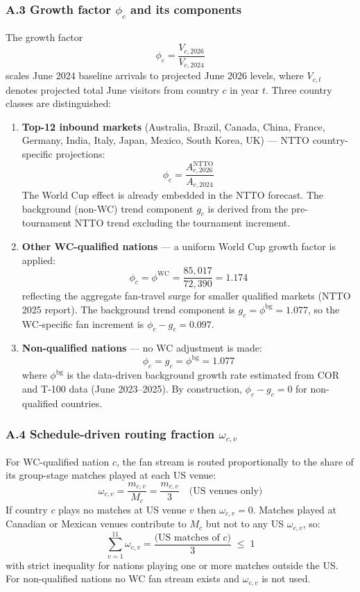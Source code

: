 \documentclass[12pt, a4paper]{article}
\begin{document}
\subsubsection*{A.3 Growth factor $\phi_c$ and its components}

The growth factor
\[
  \phi_c = \frac{V_{c,2026}}{V_{c,2024}}
\]
scales June 2024 baseline arrivals to projected June 2026 levels,
where $V_{c,t}$ denotes projected total June visitors from country
$c$ in year $t$. Three country classes are distinguished:

\begin{enumerate}
  \item \textbf{Top-12 inbound markets} (Australia, Brazil, Canada,
    China, France, Germany, India, Italy, Japan, Mexico, South Korea,
    UK) --- NTTO country-specific projections:
    \[
      \phi_c = \frac{A_{c,2026}^{\text{NTTO}}}{A_{c,2024}}
    \]
    The World Cup effect is already embedded in the NTTO forecast.
    The background (non-WC) trend component $g_c$ is derived from
    the pre-tournament NTTO trend excluding the tournament increment.

  \item \textbf{Other WC-qualified nations} --- a uniform World Cup
    growth factor is applied:
    \[
      \phi_c = \phi^{\text{WC}} = \frac{85{,}017}{72{,}390} = 1.174
    \]
    reflecting the aggregate fan-travel surge for smaller qualified
    markets (NTTO 2025 report). The background trend component is
    $g_c = \phi^{\text{bg}} = 1.077$, so the WC-specific fan
    increment is $\phi_c - g_c = 0.097$.

  \item \textbf{Non-qualified nations} --- no WC adjustment is made:
    \[
      \phi_c = g_c = \phi^{\text{bg}} = 1.077
    \]
    where $\phi^{\text{bg}}$ is the data-driven background growth
    rate estimated from COR and T-100 data (June 2023--2025).
    By construction, $\phi_c - g_c = 0$ for non-qualified countries.
\end{enumerate}

\subsubsection*{A.4 Schedule-driven routing fraction $\omega_{c,v}$}

For WC-qualified nation $c$, the fan stream is routed proportionally
to the share of its group-stage matches played at each US venue:
\[
  \omega_{c,v} = \frac{m_{c,v}}{M_c} = \frac{m_{c,v}}{3}
  \quad \text{(US venues only)}
\]
If country $c$ plays no matches at US venue $v$ then
$\omega_{c,v} = 0$. Matches played at Canadian or Mexican venues
contribute to $M_c$ but not to any US $\omega_{c,v}$, so:
\[
  \sum_{v=1}^{11} \omega_{c,v}
    = \frac{\text{(US matches of }c)}{3} \;\leq\; 1
\]
with strict inequality for nations playing one or more matches
outside the US. For non-qualified nations no WC fan stream exists
and $\omega_{c,v}$ is not used.
\end{document}

